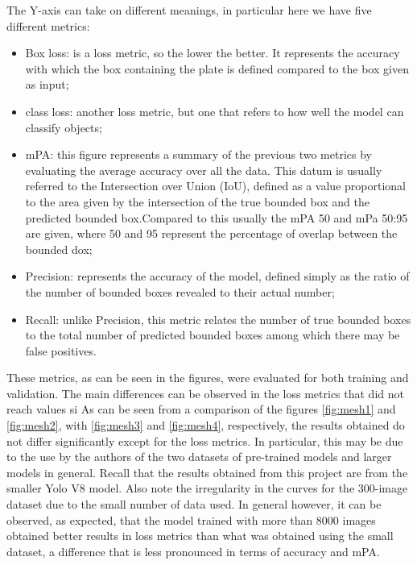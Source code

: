 \documentclass[12pt]{article}
\begin{document}
The Y-axis can take on different meanings, in particular here we have five different metrics:
\begin{itemize}
    \item Box loss: is a loss metric, so the lower the better. It represents the accuracy with which the box containing the plate is defined compared to the box given as input;
    \item class loss: another loss metric, but one that refers to how well the model can classify objects;
    \item mPA: this figure represents a summary of the previous two metrics by evaluating the average accuracy over all the data. This datum is usually referred to the Intersection over Union (IoU), defined as a value proportional to the area given by the intersection of the true bounded box and the predicted bounded box.Compared to this usually the mPA 50 and mPa 50:95 are given, where 50 and 95 represent the percentage of overlap between the bounded dox;
    \item Precision: represents the accuracy of the model, defined simply as the ratio of the number of bounded boxes revealed to their actual number;
    \item Recall: unlike Precision, this metric relates the number of true bounded boxes to the total number of predicted bounded boxes among which there may be false positives.
\end{itemize}

These metrics, as can be seen in the figures, were evaluated for both training and validation. The main differences can be observed in the loss metrics that did not reach values si As can be seen from a comparison of the figures \ref{fig:mesh1} and \ref{fig:mesh2}, with \ref{fig:mesh3} and \ref{fig:mesh4}, respectively, the results obtained do not differ significantly except for the loss metrics. In particular, this may be due to the use by the authors of the two datasets of pre-trained models and larger models in general. Recall that the results obtained from this project are from the smaller Yolo V8 model. Also note the irregularity in the curves for the 300-image dataset due to the small number of data used.
In general however, it can be observed, as expected, that the model trained with more than 8000 images obtained better results in loss metrics than what was obtained using the small dataset, a difference that is less pronounced in terms of accuracy and mPA.

\end{document}
